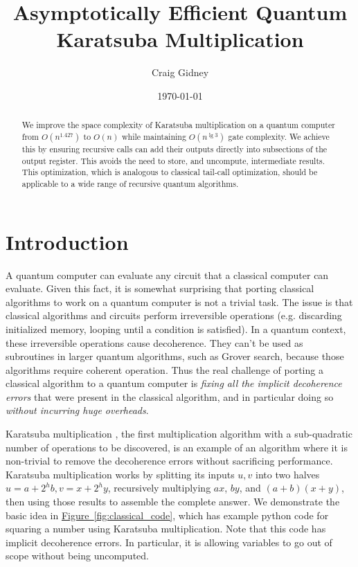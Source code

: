 \documentclass[onecolumn]{quantumarticle}
\newcommand{\fig}[1]{\hyperref[fig:#1]{Figure~\ref*{fig:#1}}}
\begin{document}
\title{Asymptotically Efficient Quantum Karatsuba Multiplication}

\date{\today}
\author{Craig Gidney}

\begin{abstract}
We improve the space complexity of Karatsuba multiplication on a quantum computer from $O(n^{1.427})$ to $O(n)$ while maintaining $O(n^{\lg 3})$ gate complexity.
We achieve this by ensuring recursive calls can add their outputs directly into subsections of the output register.
This avoids the need to store, and uncompute, intermediate results.
This optimization, which is analogous to classical tail-call optimization, should be applicable to a wide range of recursive quantum algorithms.
\end{abstract}

\maketitle


\section{Introduction}
\label{sec:introduction}

A quantum computer can evaluate any circuit that a classical computer can evaluate.
Given this fact, it is somewhat surprising that porting classical algorithms to work on a quantum computer is not a trivial task.
The issue is that classical algorithms and circuits perform irreversible operations (e.g. discarding initialized memory, looping until a condition is satisfied).
In a quantum context, these irreversible operations cause decoherence.
They can't be used as subroutines in larger quantum algorithms, such as Grover search, because those algorithms require coherent operation.
Thus the real challenge of porting a classical algorithm to a quantum computer is {\em fixing all the implicit decoherence errors} that were present in the classical algorithm, and in particular doing so {\em without incurring huge overheads}.

Karatsuba multiplication \cite{karatsuba1962multiplication}, the first multiplication algorithm with a sub-quadratic number of operations to be discovered, is an example of an algorithm where it is non-trivial to remove the decoherence errors without sacrificing performance.
Karatsuba multiplication works by splitting its inputs $u, v$ into two halves $u=a+2^{h} b, v=x+2^{h} y$, recursively multiplying $ax$, $by$, and $(a+b)(x+y)$, then using those results to assemble the complete answer.
We demonstrate the basic idea in \fig{classical_code}, which has example python code for squaring a number using Karatsuba multiplication.
Note that this code has implicit decoherence errors.
In particular, it is allowing variables to go out of scope without being uncomputed.
\end{document}

